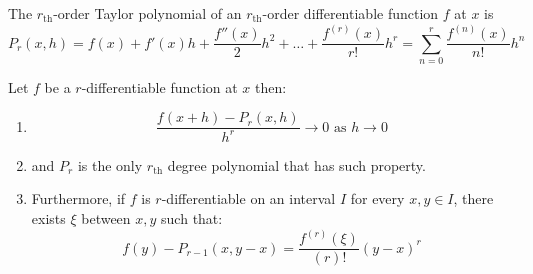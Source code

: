 \begin{definition}
    The \(r_{\text{th}}\)-order Taylor polynomial of an \(r_{\text{th}}\)-order differentiable function \(f\) at \(x\) is
    \begin{equation*}
        P_r(x,h) =f(x) + f'(x)h +  \dfrac{f''(x)}{2}h^2 + \dots +  \dfrac{f^{(r)}(x)}{r!} h^r = \sum_{n = 0}^{r}\dfrac{f^{(n)}(x)}{n!} h^n
    \end{equation*}
\end{definition}
\begin{theorem}
    Let \(f\) be a \(r\)-differentiable function at \(x\) then:
    \begin{enumerate}
        \item
              \begin{equation*}
                  \dfrac{f(x+h) - P_r(x,h)}{h^r} \to 0 \text{ as } h \to 0
              \end{equation*}
        \item
              and \(P_r\) is the only \(r_{\text{th}}\) degree polynomial that has such property.
        \item
              Furthermore, if \(f\) is \(r\)-differentiable on an interval \(I\) for every \(x,y \in I\), there exists \(\xi\) between \(x,y\) such that:
              \begin{equation*}
                  f(y) - P_{r-1}(x,y-x) = \dfrac{f^{(r)}(\xi )}{(r)!}(y-x)^{r}
              \end{equation*}
    \end{enumerate}
\end{theorem}
